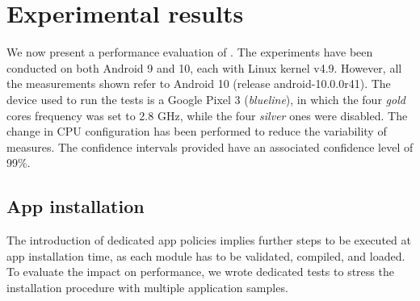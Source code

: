 \section{Experimental results}
\label{sect:seapp_performance}

We now present a performance evaluation of \pap.  The experiments have
been conducted on both Android 9 and 10, each with Linux kernel v4.9.
However, all the measurements shown refer to Android 10 (release
android-10.0.0\textunderscore r41).  The device used to run the tests
is a Google Pixel 3 (\emph{blueline}), in which the four \emph{gold}
cores frequency was set to 2.8 GHz, while the four \emph{silver} ones
were disabled.  The change in CPU configuration has been performed to
reduce the variability of measures.  The confidence intervals provided
have an associated confidence level of 99\%.


\subsection{App installation}

The introduction of dedicated app policies implies further steps to be
executed at app installation time, as each \pap module has to be
validated, compiled, and loaded.  To evaluate the impact on
performance, we wrote dedicated tests to stress the installation
procedure with multiple application samples.

